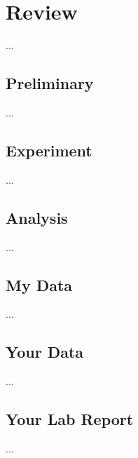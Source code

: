 \setcounter{chapter}{0}
\chapter{Review}
...
\section{Preliminary}
...
\section{Experiment}
...
\section{Analysis}
...
\section{My Data}
...
\section{Your Data}
...
\section{Your Lab Report}
...